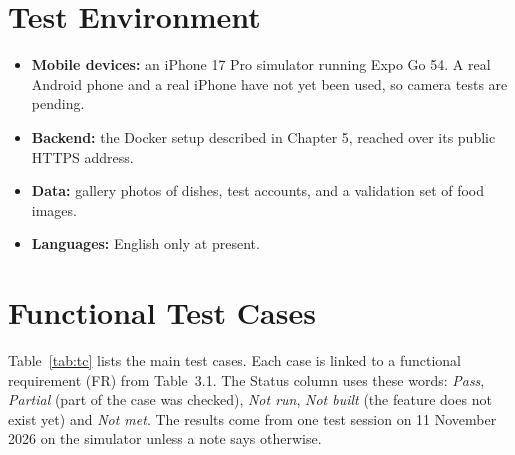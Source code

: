 \section{Test Environment}
\begin{itemize}[noitemsep]
  \item \textbf{Mobile devices:} an iPhone 17 Pro simulator running Expo Go 54. A real Android phone and a real
        iPhone have not yet been used, so camera tests are pending.
  \item \textbf{Backend:} the Docker setup described in Chapter 5, reached over its public HTTPS address.
  \item \textbf{Data:} gallery photos of dishes, test accounts, and a validation set of food images.
  \item \textbf{Languages:} English only at present.
\end{itemize}

\section{Functional Test Cases}
Table~\ref{tab:tc} lists the main test cases. Each case is linked to a functional requirement (FR) from
Table~3.1. The Status column uses these words: \emph{Pass}, \emph{Partial} (part of the case was checked),
\emph{Not run}, \emph{Not built} (the feature does not exist yet) and \emph{Not met}. The results come from one test
session on 11 November 2026 on the simulator unless a note says otherwise.

